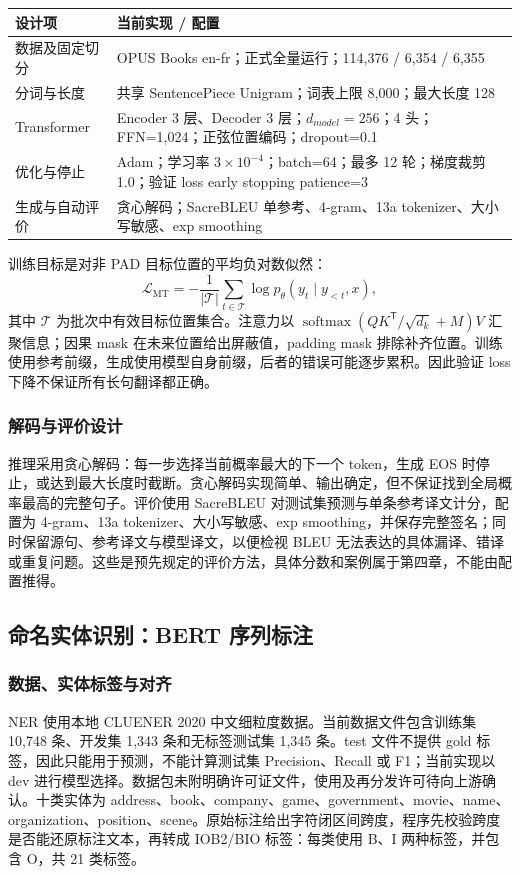 \documentclass[UTF8,a4paper,12pt,fontset=none]{ctexart}
\begin{document}
\noindent\begin{tabularx}{\textwidth}{>{\raggedright\arraybackslash}p{}Y}
\toprule
设计项 & 当前实现 / 配置 \\
\midrule
数据及固定切分 & OPUS Books en-fr；正式全量运行；114,376 / 6,354 / 6,355 \\
分词与长度 & 共享 SentencePiece Unigram；词表上限 8,000；最大长度 128 \\
Transformer & Encoder 3 层、Decoder 3 层；$d_{model}=256$；4 头；FFN=1,024；正弦位置编码；dropout=0.1 \\
优化与停止 & Adam；学习率 $3\times10^{-4}$；batch=64；最多 12 轮；梯度裁剪 1.0；验证 loss early stopping patience=3 \\
生成与自动评价 & 贪心解码；SacreBLEU 单参考、4-gram、13a tokenizer、大小写敏感、exp smoothing \\
\bottomrule
\end{tabularx}

训练目标是对非 PAD 目标位置的平均负对数似然：
\[
  \mathcal{L}_{\mathrm{MT}}=-\frac{1}{|\mathcal{T}|}
  \sum_{t\in\mathcal{T}}\log p_\theta(y_t\mid y_{<t},x),
\]
其中 $\mathcal{T}$ 为批次中有效目标位置集合。注意力以
$\operatorname{softmax}(QK^{\mathsf T}/\sqrt{d_k}+M)V$ 汇聚信息；因果 mask 在未来位置给出屏蔽值，padding mask 排除补齐位置。训练使用参考前缀，生成使用模型自身前缀，后者的错误可能逐步累积。因此验证 loss 下降不保证所有长句翻译都正确。

\subsubsection{解码与评价设计}
推理采用贪心解码：每一步选择当前概率最大的下一个 token，生成 EOS 时停止，或达到最大长度时截断。贪心解码实现简单、输出确定，但不保证找到全局概率最高的完整句子。评价使用 SacreBLEU 对测试集预测与单条参考译文计分，配置为 4-gram、13a tokenizer、大小写敏感、exp smoothing，并保存完整签名；同时保留源句、参考译文与模型译文，以便检视 BLEU 无法表达的具体漏译、错译或重复问题\cite{bleu,post}。这些是预先规定的评价方法，具体分数和案例属于第四章，不能由配置推得。

\subsection{命名实体识别：BERT 序列标注}

\subsubsection{数据、实体标签与对齐}
NER 使用本地 CLUENER 2020 中文细粒度数据。当前数据文件包含训练集 10,748 条、开发集 1,343 条和无标签测试集 1,345 条。test 文件不提供 gold 标签，因此只能用于预测，不能计算测试集 Precision、Recall 或 F1；当前实现以 dev 进行模型选择。数据包未附明确许可证文件，使用及再分发许可待向上游确认。十类实体为 address、book、company、game、government、movie、name、organization、position、scene。原始标注给出字符闭区间跨度，程序先校验跨度是否能还原标注文本，再转成 IOB2/BIO 标签：每类使用 B、I 两种标签，并包含 O，共 21 类标签\cite{cluener2020,cluener_data}。
\end{document}

